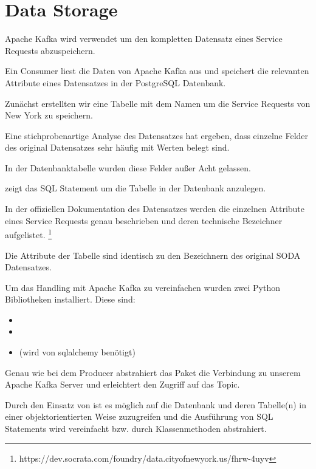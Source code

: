 \section{Data Storage}
Apache Kafka wird verwendet um den kompletten Datensatz eines Service Requests abzuspeichern.

Ein Consumer liest die Daten von Apache Kafka aus und speichert die relevanten Attribute eines Datensatzes in der PostgreSQL Datenbank.

Zunächst erstellten wir eine Tabelle mit dem Namen  um die Service Requests von New York zu speichern.

Eine stichprobenartige Analyse des Datensatzes hat ergeben, dass einzelne Felder des original Datensatzes sehr häufig mit 
Werten belegt sind.

In der Datenbanktabelle  wurden diese Felder außer Acht gelassen.

 zeigt das \ac{SQL} Statement um die Tabelle  in der Datenbank anzulegen.



In der offiziellen Dokumentation des Datensatzes werden die einzelnen Attribute
eines Service Requests genau beschrieben und deren technische Bezeichner aufgelistet.
\footnote{https://dev.socrata.com/foundry/data.cityofnewyork.us/fhrw-4uyv}

Die Attribute der Tabelle  sind identisch zu den
Bezeichnern des original \ac{SODA} Datensatzes.

Um das Handling mit Apache Kafka zu vereinfachen wurden zwei Python
Bibliotheken installiert.
Diese sind:

\begin{itemize}
  \item {}
  \item {}
  \item {} (wird von sqlalchemy benötigt)
\end{itemize}

Genau wie bei dem Producer abstrahiert das Paket  die Verbindung zu unserem Apache Kafka Server und erleichtert den Zugriff auf das Topic.

Durch den Einsatz von  ist es möglich auf die Datenbank und deren Tabelle(n) in einer objektorientierten Weise zuzugreifen
und die Ausführung von \ac{SQL} Statements wird vereinfacht bzw. durch Klassenmethoden abstrahiert.

